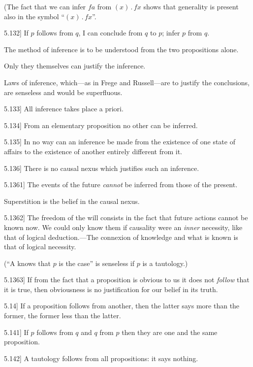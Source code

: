 \documentclass[12pt,oneside]{book}[2007/10/19]
\newcommand{\PropositionE}[2]{%
  \item[\phantomsection\label{PropE:#1}\PropGRef{#1}] #2%
}
\newcommand{\PropGRef}[1]{\hyperref[PropG:#1]{#1}}
\newcommand{\DotOp}{\mathbin{.}}
\begin{document}
\begin{propositions}
{(The fact that we can infer $fa$ from $(x) \DotOp fx$ shows
that generality is present also in the symbol
``$(x) \DotOp fx$''.}


\PropositionE{5.132}
{If $p$ follows from $q$, I can conclude from $q$ to $p$;
infer $p$ from $q$.

The method of inference is to be understood
from the two propositions alone.

Only they themselves can justify the inference.

Laws of inference, which---as in Frege and
Russell---are to justify the conclusions, are senseless
and would be superfluous.}


\PropositionE{5.133}
{All inference takes place a priori.}


\PropositionE{5.134}
{From an elementary proposition no other can
be inferred.}


\PropositionE{5.135}
{In no way can an inference be made from the
existence of one state of affairs to the existence of
another entirely different from it.}


\PropositionE{5.136}
{There is no causal nexus which justifies such
an inference.}


\PropositionE{5.1361}
{The events of the future \emph{cannot} be inferred from
those of the present.

Superstition is the belief in the causal
nexus.}


\PropositionE{5.1362}
{The freedom of the will consists in the fact that
future actions cannot be known now. We could
only know them if causality were an \emph{inner} necessity,
like that of logical deduction.---The connexion
of knowledge and what is known is that of logical
necessity.

(``A knows that $p$ is the case'' is senseless if $p$
is a tautology.)}


\PropositionE{5.1363}
{If from the fact that a proposition is obvious
to us it does not \emph{follow} that it is true, then obviousness
is no justification for our belief in its truth.}


\PropositionE{5.14}
{If a proposition follows from another, then the
latter says more than the former, the former less
than the latter.}


\PropositionE{5.141}
{If $p$ follows from $q$ and $q$ from $p$ then they are
one and the same proposition.}


\PropositionE{5.142}
{A tautology follows from all propositions: it
says nothing.}



\end{propositions}
\end{document}
